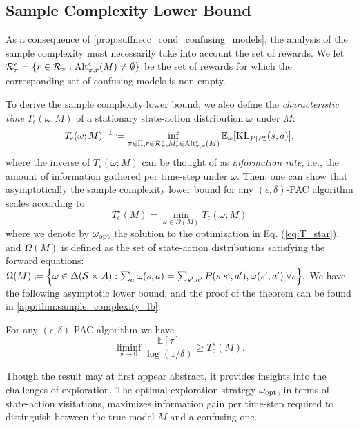  
\subsection{Sample Complexity Lower Bound} 
As a  consequence of \cref{prop:suffnecc_cond_confusing_models}, the analysis of the sample complexity must necessarily take into account the set of rewards. We let ${\cal R}_\pi^\epsilon =\{r\in {\cal R}_\pi: {\rm Alt}_{\pi,r}^\epsilon(M) \neq \emptyset\}$ be the set of rewards for which the corresponding set of confusing models is non-empty.

To derive the sample complexity lower bound, we also define the \emph{characteristic time} $ T_\epsilon(\omega;M)$ of a stationary state-action distribution $\omega$ under $M$:\begin{equation}\label{eq:T_epsilon_omega} T_\epsilon(\omega;M)^{-1}\coloneqq \inf_{\pi\in \Pi,r\in {\cal R}_\pi^\epsilon, M_r'\in {\rm Alt}_{\pi,r}^\epsilon(M)}\mathbb{E}_{\omega}[{\rm KL}_{P|P_r'}(s,a)], \end{equation}
where the inverse of $ T_\epsilon(\omega;M)$ can be thought of as \emph{information rate}, i.e., the amount of information gathered per time-step under $\omega$.
Then, one can show that asymptotically the sample complexity lower bound for any $(\epsilon,\delta)$-PAC algorithm scales according to  \begin{equation}\label{eq:T_star}
    T_\epsilon^\star(M) = \min_{\omega \in \Omega(M)} T_\epsilon(\omega;M)
\end{equation}
where   we    denote by $\omega_{\rm opt}$ the  solution to the optimization in Eq. (\ref{eq:T_star}), and $\Omega(M)$  is defined as the set of state-action distributions satisfying the forward equations:
$\Omega(M)\coloneqq \Big\{\omega\in \Delta({\cal S}\times{\cal A}):  \sum_{a} \omega(s,a) = \sum_{s',a'} P(s|s',a'),\omega(s',a')\;\forall s \Big\}.$
 We have the following asymptotic lower bound, and the proof of the theorem can be found in \cref{app:thm:sample_complexity_lb}.
 \begin{tcolorbox}
\begin{theorem}\label{thm:sample_complexity_lb}For any $(\epsilon,\delta)$-PAC algorithm we have \begin{equation}\label{eq:lower_bound}
    \liminf_{\delta \to 0}\frac{\mathbb{E}[\tau]}{\log(1/\delta)} \geq T_\epsilon^\star(M).
    \end{equation}
\end{theorem}
\end{tcolorbox}
Though the result may at first appear abstract, it provides  insights into the challenges of exploration. The optimal exploration strategy $\omega_{\rm opt}$, in terms of state-action visitations,  maximizes information gain per time-step  required to  distinguish between the true model $M$ and a confusing one.

